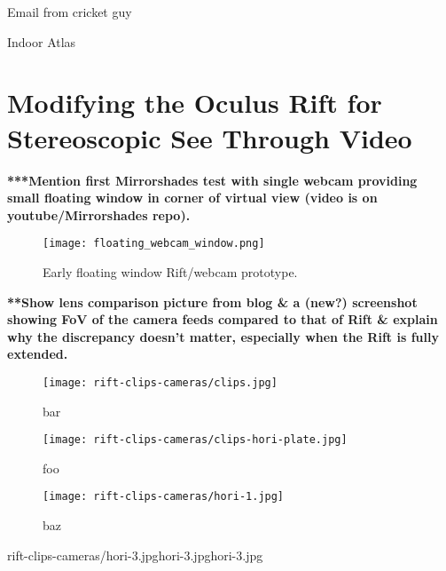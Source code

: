 Email from cricket guy

Indoor Atlas


\section{Modifying the Oculus Rift for Stereoscopic See Through Video}

\textbf{***Mention first Mirrorshades test with single webcam providing small floating window in corner of virtual view (video is on youtube/Mirrorshades repo).}

\newcommand{\floatingwebcamFootnote}{\footnote{\url{https://www.youtube.com/watch?v=tS0FGZxQzCU}}}

\begin{figure}[h]
	\begin{center}
		\texttt{[image: floating\_webcam\_window.png]}
		\caption{Early floating window Rift/webcam prototype.}
		\label{floating_webcam_window.png}
	\end{center}
\end{figure}

\textbf{**Show lens comparison picture from blog \& a (new?) screenshot showing FoV of the camera feeds compared to that of Rift \& explain why the discrepancy doesn't matter, especially when the Rift is fully extended.}

\begin{figure}[!htb]
    \centering
    \begin{minipage}{.33\textwidth}
        \centering
        \texttt{[image: rift-clips-cameras/clips.jpg]}
        \caption{bar}
        \label{bar}
    \end{minipage}%
    \begin{minipage}{0.33\textwidth}
        \centering
        \texttt{[image: rift-clips-cameras/clips-hori-plate.jpg]}
        \caption{foo}
        \label{foo}
    \end{minipage}
    \begin{minipage}{0.33\textwidth}
        \centering
        \texttt{[image: rift-clips-cameras/hori-1.jpg]}
        \caption{baz}
        \label{baz}
    \end{minipage}
\end{figure}

       {rift-clips-cameras/hori-3.jpg}{hori-3.jpg}{hori-3.jpg}

